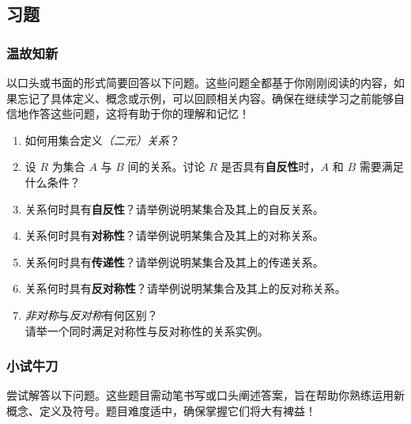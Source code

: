 
\subsection{习题}\label{sec:section6.2.5}

\subsubsection*{温故知新}

以口头或书面的形式简要回答以下问题。这些问题全都基于你刚刚阅读的内容，如果忘记了具体定义、概念或示例，可以回顾相关内容。确保在继续学习之前能够自信地作答这些问题，这将有助于你的理解和记忆！

\begin{enumerate}[label=(\arabic*)]
    \item 如何用集合定义\emph{（二元）关系}？
    \item 设 $R$ 为集合 $A$ 与 $B$ 间的关系。讨论 $R$ 是否具有\textbf{自反性}时，$A$ 和 $B$ 需要满足什么条件？
    \item 关系何时具有\textbf{自反性}？请举例说明某集合及其上的自反关系。
    \item 关系何时具有\textbf{对称性}？请举例说明某集合及其上的对称关系。
    \item 关系何时具有\textbf{传递性}？请举例说明某集合及其上的传递关系。
    \item 关系何时具有\textbf{反对称性}？请举例说明某集合及其上的反对称关系。
    \item \emph{非对称}与\emph{反对称}有何区别？\\
        请举一个同时满足对称性与反对称性的关系实例。
\end{enumerate}

\subsubsection*{小试牛刀}

尝试解答以下问题。这些题目需动笔书写或口头阐述答案，旨在帮助你熟练运用新概念、定义及符号。题目难度适中，确保掌握它们将大有裨益！

